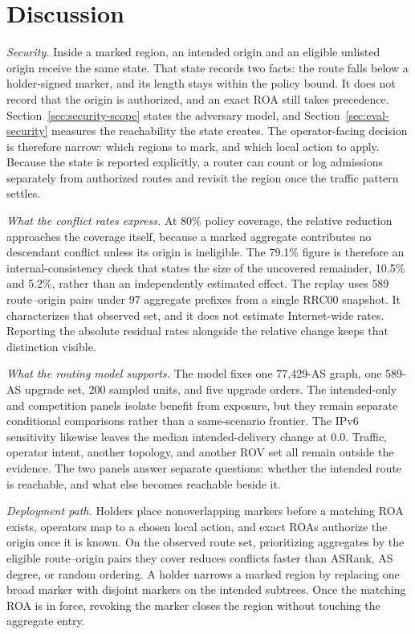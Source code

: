 \section{Discussion}
\label{sec:discussion}

{\revstart \emph{Security.} Inside a marked region, an intended origin and an eligible unlisted origin receive the same \openscope{} state. That state records two facts: the route falls below a holder-signed marker, and its length stays within the policy bound. It does not record that the origin is authorized, and an exact ROA still takes precedence. Section~\ref{sec:security-scope} states the adversary model, and Section~\ref{sec:eval-security} measures the reachability the state creates. The operator-facing decision is therefore narrow: which regions to mark, and which local action to apply. Because the state is reported explicitly, a router can count or log \openscope{} admissions separately from authorized routes and revisit the region once the traffic pattern settles.}

{\revstart \emph{What the conflict rates express.} At 80\% policy coverage, the relative reduction approaches the coverage itself, because a marked aggregate contributes no descendant conflict unless its origin is ineligible. The 79.1\% figure is therefore an internal-consistency check that states the size of the uncovered remainder, 10.5\% and 5.2\%, rather than an independently estimated effect. The replay uses 589 route--origin pairs under 97 aggregate prefixes from a single RRC00 snapshot. It characterizes that observed set, and it does not estimate Internet-wide rates. Reporting the absolute residual rates alongside the relative change keeps that distinction visible.}

{\revstart \emph{What the routing model supports.} The model fixes one 77,429-AS graph, one 589-AS upgrade set, 200 sampled units, and five upgrade orders. The intended-only and competition panels isolate benefit from exposure, but they remain separate conditional comparisons rather than a same-scenario frontier. The IPv6 sensitivity likewise leaves the median intended-delivery change at 0.0. Traffic, operator intent, another topology, and another ROV set all remain outside the evidence. The two panels answer separate questions: whether the intended route is reachable, and what else becomes reachable beside it.}

{\revstart \emph{Deployment path.} Holders place nonoverlapping markers before a matching ROA exists, operators map \openscope{} to a chosen local action, and exact ROAs authorize the origin once it is known. On the observed route set, prioritizing aggregates by the eligible route--origin pairs they cover reduces conflicts faster than ASRank, AS degree, or random ordering. A holder narrows a marked region by replacing one broad marker with disjoint markers on the intended subtrees. Once the matching ROA is in force, revoking the marker closes the region without touching the aggregate entry.}
